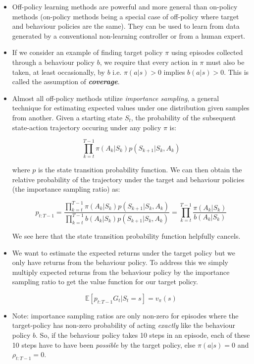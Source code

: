 \begin{itemize}
\item Off-policy learning methods are powerful and more general than on-policy methods (on-policy methods being a special case of off-policy where target and behaviour policies are the same). They can be used to learn from data generated by a conventional non-learning controller or from a human expert.
\item If we consider an example of finding target policy $\pi$ using episodes collected through a behaviour policy $b$, we require that every action in $\pi$ must also be taken, at least occasionally, by $b$ i.e. $\pi(a|s) > 0$ implies $b(a|s) > 0$. This is called the assumption of \textit{\textbf{coverage}}. 
\item Almost all off-policy methods utilize \textit{importance sampling}, a general technique for estimating expected values under one distribution given samples from another. Given a starting state $S_t$, the probability of the subsequent state-action trajectory occuring under any policy $\pi$ is:

\begin{equation}
	\prod_{k=t}^{T-1} \pi(A_k|S_k)p(S_{k+1}|S_k, A_k)
\end{equation}

where $p$ is the state transition probability function. We can then obtain the relative probability of the trajectory under the target and behaviour policies (the importance sampling ratio) as:

\begin{equation} \label{eq: importance sampling ratio}
p_{t:T-1} = \frac{\prod_{k=t}^{T-1} \pi(A_k|S_k)p(S_{k+1}|S_k, A_k)}{\prod_{k=t}^{T-1} b(A_k|S_k)p(S_{k+1}|S_k, A_k)} = \prod_{k=t}^{T-1} \frac{\pi(A_k|S_k)}{b(A_k|S_k)}
\end{equation}

We see here that the state transition probability function helpfully cancels.

\item We want to estimate the expected returns under the target policy but we only have returns from the behaviour policy. To address this we simply multiply expected returns from the behaviour policy by the importance sampling ratio to get the value function for our target policy.

\begin{equation}
\mathbb{E} \left[p_{t:T-1} G_t | S_t = s\right] = v_\pi(s)
\end{equation}

\item Note: importance sampling ratios are only non-zero for episodes where the target-policy has non-zero probability of acting \textit{exactly} like the behaviour policy $b$. So, if the behaviour policy takes 10 steps in an episode, each of these 10 steps have to have been \textit{possible} by the target policy, else $\pi(a|s) = 0$ and $\rho_{t:T-1} = 0$.

\end{itemize}

